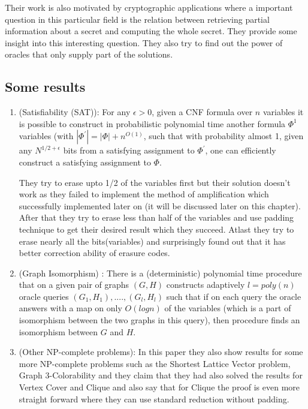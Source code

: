 Their work is also motivated by cryptographic applications where a important question in this particular field is the relation between retrieving partial information about a secret and computing the whole secret. They provide some insight into this interesting question. They also try to find out the power of oracles that only supply part of the solutions.


\subsection{Some results}

\begin{enumerate}
\item (Satisfiability (SAT)): For any $\epsilon > 0$, given a CNF formula over $n$ variables it is possible to construct in probabilistic polynomial time another formula $\Phi^{1}$ variables (with $|\Phi^{'}|=|\Phi|+ n^{O(1)}$, such that with probability almost 1, given any $N^{1/2+\epsilon}$ bits from a satisfying assignment to $\Phi^{'}$, one can efficiently construct a satisfying assignment to $\Phi$. \cite{GHLP99}

They try to erase upto 1/2 of the variables first but their solution doesn't work as they failed to implement the method of amplification which \cite{FLN00} successfully implemented later on (it will be discussed later on this chapter). After that they try to erase less than half of the variables and use padding technique to get their desired result which they succeed. Atlast they try to erase nearly all the bits(variables) and surprisingly found out that it has better correction ability of erasure codes. 


\item (Graph Isomorphism) : There is a (deterministic) polynomial time procedure that on a given pair of graphs $(G,H)$ constructs adaptively $l=poly(n)$ oracle queries $(G_1,H_1),....,(G_l,H_l)$ such that if on each query the oracle answers with a map on only $O(log n)$ of the variables (which is a part of isomorphism between the two graphs in this query), then procedure finds an isomorphism between $G$ and $H$. \cite{GHLP99}

\item (Other NP-complete problems): In this paper they also show results for some more NP-complete problems such as the Shortest Lattice Vector problem, Graph 3-Colorability and they claim that they had also solved the results for Vertex Cover and Clique and also say that for Clique the proof is even more straight forward where they can use standard reduction without padding. 

\end{enumerate}











